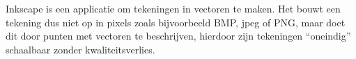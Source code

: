 Inkscape is een applicatie om tekeningen in vectoren te maken. Het bouwt een tekening dus niet op in
pixels zoals bijvoorbeeld BMP, jpeg of PNG, maar doet dit door punten met vectoren te beschrijven, hierdoor zijn
tekeningen ``oneindig'' schaalbaar zonder kwaliteitsverlies.

